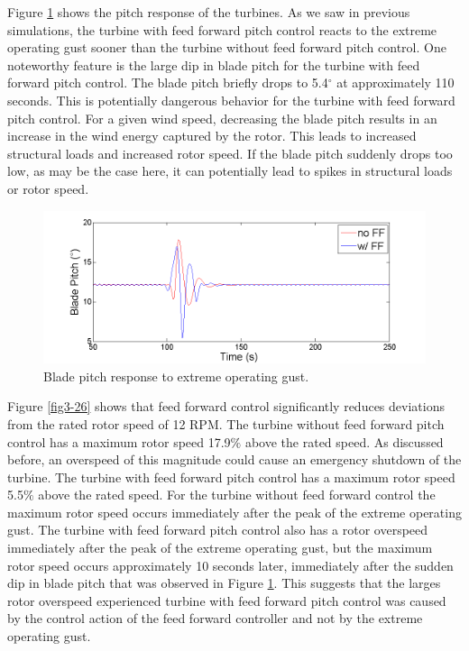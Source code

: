 Figure \ref{fig3-25} shows the pitch response of the turbines. As we saw in previous simulations, the turbine with feed forward pitch control reacts to the extreme operating gust sooner than the turbine without feed forward pitch control. One noteworthy feature is the large dip in blade pitch for the turbine with feed forward pitch control. The blade pitch briefly drops to 5.4$^\circ$ at approximately 110 seconds. This is potentially dangerous behavior for the turbine with feed forward pitch control. For a given wind speed, decreasing the blade pitch results in an increase in the wind energy captured by the rotor. This leads to increased structural loads and increased rotor speed. If the blade pitch suddenly drops too low, as may be the case here, it can potentially lead to spikes in structural loads or rotor speed. 

\begin{figure}[htbp]
	\centering
		\includegraphics[width = \linewidth]{Figures/ch3Figures/fig3-25.png}
		
	\caption{Blade pitch response to extreme operating gust. }
	\label{fig3-25}
\end{figure}

Figure \ref{fig3-26} shows that feed forward control significantly reduces deviations from the rated rotor speed of 12 RPM. The turbine without feed forward pitch control has a maximum rotor speed 17.9$\%$ above the rated speed. As discussed before, an overspeed of this magnitude could cause an emergency shutdown of the turbine. The turbine with feed forward pitch control has a maximum rotor speed 5.5$\%$ above the rated speed. For the turbine without feed forward control the maximum rotor speed occurs immediately after the peak of the extreme operating gust. The turbine with feed forward pitch control also has a rotor overspeed immediately after the peak of the extreme operating gust, but the maximum rotor speed occurs approximately 10 seconds later, immediately after the sudden dip in blade pitch that was observed in Figure \ref{fig3-25}. This suggests that the larges rotor overspeed experienced turbine with feed forward pitch control was caused by the control action of the feed forward controller and not by the extreme operating gust.

